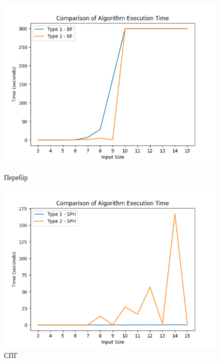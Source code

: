\documentclass[a4paper,12pt]{article}
\begin{document}
\begin{figure}[!htb]
  \includegraphics[width=\linewidth]{plot3.png}
  \caption{Перебір}\label{fig:bf}
\endminipage\hfill
{}
  \includegraphics[width=\linewidth]{plot4.png}
  \caption{СПГ}\label{fig:sph}
\endminipage\hfill
\end{figure}
\end{document}
